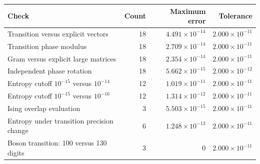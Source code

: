 \begin{center}\begin{minipage}{\linewidth}\centering\small\captionsetup{hypcap=false}\begin{tabular}{lrrr}\toprule
Check & Count & Maximum error & Tolerance\\\midrule
Transition versus explicit vectors & 18 & $4.491\!\times\!10^{-14}$ & $2.000\!\times\!10^{-11}$\\
Transition phase modulus & 18 & $2.709\!\times\!10^{-14}$ & $2.000\!\times\!10^{-11}$\\
Gram versus explicit large matrices & 18 & $2.354\!\times\!10^{-14}$ & $2.000\!\times\!10^{-11}$\\
Independent phase rotation & 18 & $5.662\!\times\!10^{-15}$ & $2.000\!\times\!10^{-12}$\\
Entropy cutoff $10^{-15}$ versus $10^{-14}$ & 12 & $1.019\!\times\!10^{-11}$ & $2.000\!\times\!10^{-11}$\\
Entropy cutoff $10^{-15}$ versus $10^{-16}$ & 12 & $1.314\!\times\!10^{-12}$ & $2.000\!\times\!10^{-11}$\\
Ising overlap evaluation & 3 & $5.503\!\times\!10^{-15}$ & $2.000\!\times\!10^{-11}$\\
Entropy under transition precision change & 6 & $1.248\!\times\!10^{-13}$ & $2.000\!\times\!10^{-11}$\\
Boson transition: 100 versus 130 digits & 3 & 0 & $2.000\!\times\!10^{-11}$\\
\bottomrule\end{tabular}\label{tab:complement-checks}\end{minipage}\end{center}
